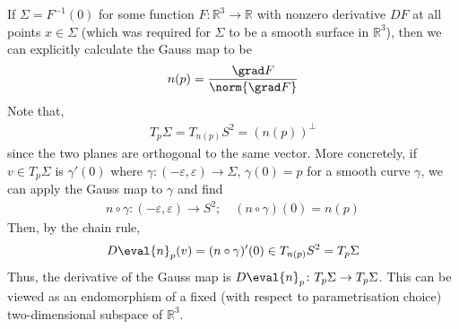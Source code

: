 \begin{remark}
	If $\Sigma = F^{-1}(0)$ for some function $F \colon \mathbb R^3 \to \mathbb R$ with nonzero derivative $DF$ at all points $x \in \Sigma$ (which was required for $\Sigma$ to be a smooth surface in $\mathbb R^3$), then we can explicitly calculate the Gauss map to be
	\begin{align*}
		n(p) = \frac{\grad F}{\norm{\grad F}}
	\end{align*}
	Note that,
	\begin{align*}
		T_p \Sigma = T_{n(p)} S^2 = (n(p))^\perp
	\end{align*}
	since the two planes are orthogonal to the same vector.
	More concretely, if $v \in T_p \Sigma$ is $\gamma'(0)$ where $\gamma \colon (-\varepsilon, \varepsilon) \to \Sigma$, $\gamma(0) = p$ for a smooth curve $\gamma$, we can apply the Gauss map to $\gamma$ and find
	\begin{align*}
		n \circ \gamma \colon (-\varepsilon, \varepsilon) \to S^2;\quad (n \circ \gamma)(0) = n(p)
	\end{align*}
	Then, by the chain rule,
	\begin{align*}
		D\eval{n}_p(v) = (n \circ \gamma)'(0) \in T_{n(p)} S^2 = T_p \Sigma
	\end{align*}
	Thus, the derivative of the Gauss map is $D\eval{n}_p \colon T_p \Sigma \to T_p \Sigma$.
	This can be viewed as an endomorphism of a fixed (with respect to parametrisation choice) two-dimensional subspace of $\mathbb R^3$.


\end{remark}
